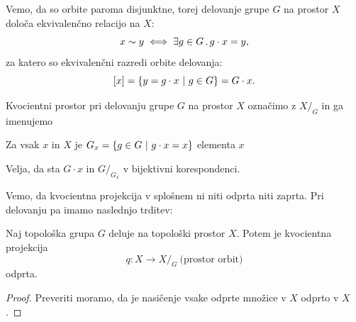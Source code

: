 Vemo, da so orbite paroma disjunktne, torej delovanje grupe \(G\) na prostor \(X\) določa ekvivalenčno relacijo na \(X\):
\[x \sim y \iff \exists g \in G \,.\, g \cdot x = y,\]
za katero so ekvivalenčni razredi orbite delovanja:
\[[x] = \left\{y = g \cdot x \ | \ g \in G\right\} = G \cdot x.\]
%
\begin{definicija}
    Kvocientni prostor pri delovanju grupe \(G\) na prostor \(X\) označimo z \(X/_G\) in ga imenujemo 
\end{definicija}

\begin{definicija}
    Za vsak \(x\) in \(X\) je \(G_x = \left\{g \in G \ | \ g \cdot x = x\right\}\)  elementa \(x\)
\end{definicija}

\begin{opomba}
    Velja, da sta \(G \cdot x\) in \(G/_{G_x}\) v bijektivni korespondenci.
\end{opomba}

\begin{primer}
    \todo{}
\end{primer}

Vemo, da kvocientna projekcija v splošnem ni niti odprta niti zaprta. Pri delovanju pa imamo naslednjo trditev:
\begin{trditev}
    Naj topološka grupa \(G\) deluje na topološki prostor \(X\). Potem je kvocientna projekcija 
    \[q: X \to X/_G \ \text{(prostor orbit)}\]
    odprta.
\end{trditev}

\begin{proof}
    Preveriti moramo, da je nasičenje vsake odprte množice v \(X\) odprto v \(X\).
\end{proof}